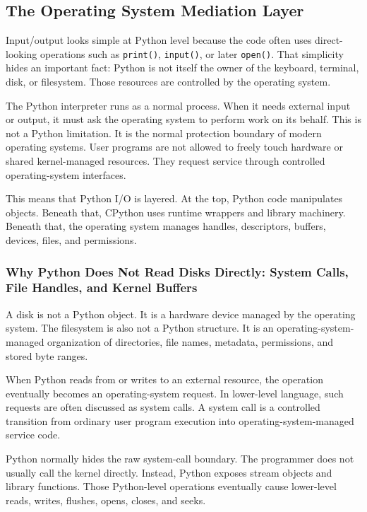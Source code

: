 \subsection{The Operating System Mediation Layer}

Input/output looks simple at Python level because the code often uses direct-looking operations such as \texttt{print()}, \texttt{input()}, or later \texttt{open()}. That simplicity hides an important fact: Python is not itself the owner of the keyboard, terminal, disk, or filesystem. Those resources are controlled by the operating system.

The Python interpreter runs as a normal process. When it needs external input or output, it must ask the operating system to perform work on its behalf. This is not a Python limitation. It is the normal protection boundary of modern operating systems. User programs are not allowed to freely touch hardware or shared kernel-managed resources. They request service through controlled operating-system interfaces.

This means that Python I/O is layered. At the top, Python code manipulates objects. Beneath that, CPython uses runtime wrappers and library machinery. Beneath that, the operating system manages handles, descriptors, buffers, devices, files, and permissions.

\subsubsection{Why Python Does Not Read Disks Directly: System Calls, File Handles, and Kernel Buffers}

A disk is not a Python object. It is a hardware device managed by the operating system. The filesystem is also not a Python structure. It is an operating-system-managed organization of directories, file names, metadata, permissions, and stored byte ranges.

When Python reads from or writes to an external resource, the operation eventually becomes an operating-system request. In lower-level language, such requests are often discussed as system calls. A system call is a controlled transition from ordinary user program execution into operating-system-managed service code.

Python normally hides the raw system-call boundary. The programmer does not usually call the kernel directly. Instead, Python exposes stream objects and library functions. Those Python-level operations eventually cause lower-level reads, writes, flushes, opens, closes, and seeks.

